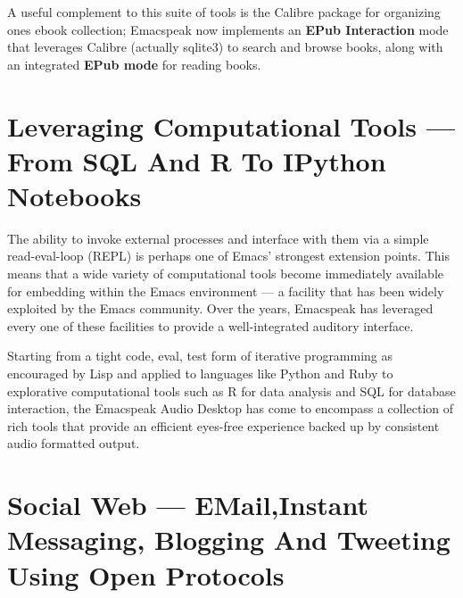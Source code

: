 \documentclass[11pt]{article}
\begin{document}
A useful complement to this suite of tools is the Calibre package
for organizing ones ebook collection; Emacspeak now implements an
\textbf{EPub Interaction} mode that leverages Calibre (actually sqlite3)
to search and browse books, along with an integrated \textbf{EPub mode}
for reading books.

\section{Leveraging Computational Tools —  From SQL And R To IPython Notebooks}
\label{sec-12}

The ability to invoke external processes and interface with them
via a simple read-eval-loop (REPL) is perhaps one of Emacs'
strongest extension points. This means that a wide variety of
computational tools become immediately available for embedding
within the Emacs environment — a facility that has been widely
exploited by the Emacs community. Over the years, Emacspeak has
leveraged every one of these facilities to provide a
well-integrated auditory interface.

Starting from a tight code, eval, test form of iterative
programming as encouraged by Lisp and applied to languages like
Python and Ruby to explorative computational tools such as R for
data analysis and SQL for database interaction, the Emacspeak
Audio Desktop has come to encompass a collection of rich tools
that provide an efficient eyes-free experience backed up by
consistent audio formatted output.

\section{Social Web  — EMail,Instant Messaging, Blogging  And Tweeting Using Open Protocols}
\label{sec-13}
\end{document}
